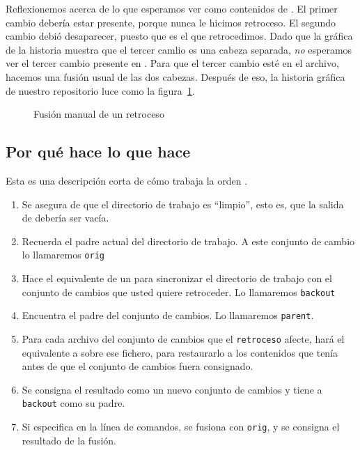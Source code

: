 Reflexionemos acerca de lo que esperamos ver como contenidos de
.  El primer cambio debería estar presente, porque
nunca le hicimos retroceso.  El segundo cambio debió desaparecer,
puesto que es el que retrocedimos.  Dado que la gráfica de la historia
muestra que el tercer camlio es una cabeza separada, \emph{no}
esperamos ver el tercer cambio presente en .
Para que el tercer cambio esté en el archivo, hacemos una fusión usual
de las dos cabezas.
Después de eso, la historia gráfica de nuestro repositorio luce como
la figura~\ref{fig:undo:backout-manual-merge}.

\begin{figure}[htb]
  \centering
  \caption{Fusión manual de un retroceso}
  \label{fig:undo:backout-manual-merge}
\end{figure}

\subsection{Por qué  hace lo que hace}

Esta es una descripción corta de cómo trabaja la orden .
\begin{enumerate}
\item Se asegura de que el directorio de trabajo es ``limpio'', esto
  es, que la salida de  debería ser vacía.
\item Recuerda el padre actual del directorio de trabajo. A este
  conjunto de cambio lo llamaremos \texttt{orig}
\item Hace el equivalente de un  para sincronizar el
  directorio de trabajo con el conjunto de cambios que usted quiere
  retroceder. Lo llamaremos \texttt{backout}
\item Encuentra el padre del conjunto de cambios. Lo llamaremos
  \texttt{parent}.
\item Para cada archivo del conjunto de cambios que el
  \texttt{retroceso} afecte, hará el equivalente a
   sobre ese fichero, para restaurarlo a
  los contenidos que tenía antes de que el conjunto de cambios fuera
  consignado.
\item Se consigna el resultado como un nuevo conjunto de cambios y
  tiene a  \texttt{backout} como su padre.
\item Si especifica  en la línea de comandos,
  se fusiona con \texttt{orig}, y se consigna el resultado de la
  fusión.
\end{enumerate}

